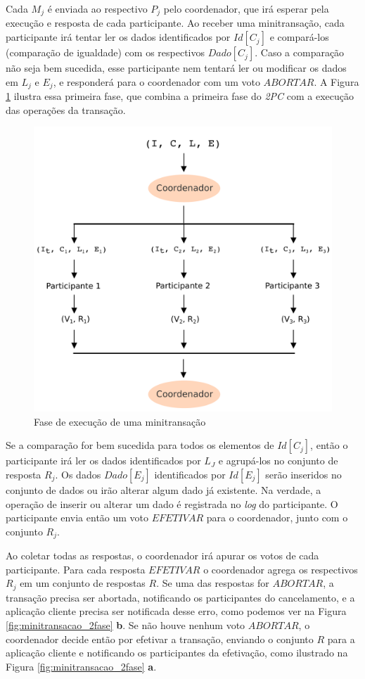 \documentclass[11pt,twoside,a4paper]{book}
\begin{document}
Cada $M_j$ é enviada ao respectivo $P_j$ pelo coordenador, que irá esperar pela execução e resposta de cada participante. Ao receber uma minitransação, cada participante irá tentar ler os dados identificados por $Id[C_j]$ e compará-los (comparação de igualdade) com os respectivos $Dado[C_j]$. Caso a comparação não seja bem sucedida, esse participante nem tentará ler ou modificar os dados em $L_j$ e $E_j$, e responderá para o coordenador com um voto $ABORTAR$. A Figura \ref{fig:minitransacao_1fase} ilustra essa primeira fase, que combina a primeira fase do \emph{2PC} com a execução das operações da transação.

\begin{figure}
  \centering
  \includegraphics[width=.65\textwidth]{minitransacao_1fase} 
  \caption{Fase de execução de uma minitransação}
  \label{fig:minitransacao_1fase} 
\end{figure}

Se a comparação for bem sucedida para todos os elementos de $Id[C_j]$, então o participante irá ler os dados identificados por $L_J$ e agrupá-los no conjunto de resposta $R_j$. Os dados $Dado[E_j]$ identificados por $Id[E_j]$ serão inseridos no conjunto de dados ou irão alterar algum dado já existente. Na verdade, a operação de inserir ou alterar um dado é registrada no \emph{log} do participante. O participante envia então um voto $EFETIVAR$ para o coordenador, junto com o conjunto $R_j$. 

Ao coletar todas as respostas, o coordenador irá apurar os votos de cada participante. Para cada resposta $EFETIVAR$ o coordenador agrega os respectivos $R_j$ em um conjunto de respostas $R$. Se uma das respostas for $ABORTAR$, a transação precisa ser abortada, notificando os participantes do cancelamento, e a aplicação cliente precisa ser notificada desse erro, como podemos ver na Figura \ref{fig:minitransacao_2fase} \textbf{b}. Se não houve nenhum voto $ABORTAR$, o coordenador decide então por efetivar a transação, enviando o conjunto $R$ para a aplicação cliente e notificando os participantes da efetivação, como ilustrado na Figura \ref{fig:minitransacao_2fase} \textbf{a}.
\end{document}
